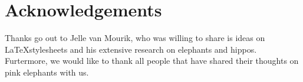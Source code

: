 \section{Acknowledgements}
\label{sec:Acknowledgements}
Thanks go out to Jelle van Mourik, who was willing to share is ideas on \LaTeX  stylesheets and his extensive research on elephants and hippos. Furtermore, we would like to thank all people that have shared their thoughts on pink elephants with us.